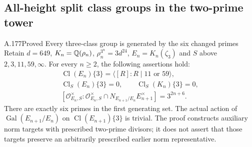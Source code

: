 \subsection{All-height split class groups in the two-prime tower}

\begin{statement}{A.177}{Proved}
{Every three-class group is generated by the six changed primes}
Retain $d=649$, $K_n=\mathbb Q(\rho_n)$, $\rho_n^{3^n}=3d^{24}$,
$E_n=K_n(\zeta_3)$ and $S$ above $2,3,11,59,\infty$.
For every $n\ge2$, the following assertions hold:
\[
 \begin{gathered}
 \operatorname{Cl}(E_n)\{3\}
   =\langle[R]:R\mid11\text{ or }59\rangle,\\
 \operatorname{Cl}_S(E_n)\{3\}=0,
       \qquad \operatorname{Cl}_S(K_n)\{3\}=0,\\
 [\mathcal O_{E_n,S}^{\times}:
   \mathcal O_{E_n,S}^{\times}\cap N_{E_{n+1}/E_n}E_{n+1}^{\times}]
                         =3^{2n+6}.
 \end{gathered}
\tag{A.177.1}
\]
There are exactly six primes in the first generating set.
The actual action of $\operatorname{Gal}(E_{n+1}/E_n)$ on
$\operatorname{Cl}(E_{n+1})\{3\}$ is trivial.
The proof constructs auxiliary norm targets with prescribed two-prime
divisors; it does not assert that those targets preserve an arbitrarily
prescribed earlier norm representative.
\end{statement}

